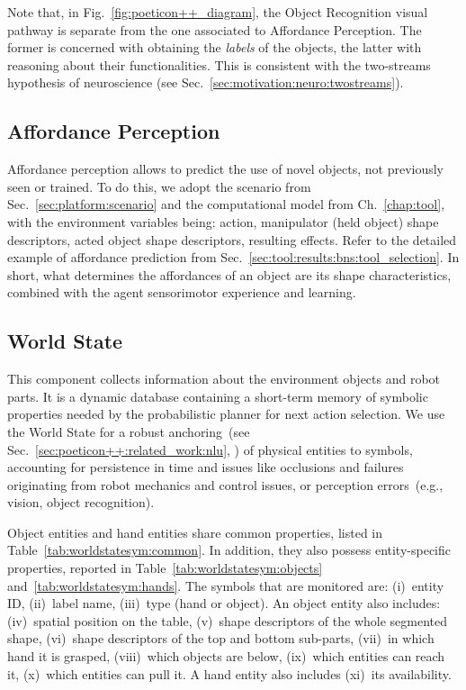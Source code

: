 Note that, in Fig.~\ref{fig:poeticon++_diagram}, the Object Recognition visual pathway is separate from the one associated to Affordance Perception.
The former is concerned with obtaining the \emph{labels} of the objects, the latter with reasoning about their functionalities.
This is consistent with the two-streams hypothesis of neuroscience (see Sec.~\ref{sec:motivation:neuro:twostreams}).

\subsection{Affordance Perception}
\label{sec:poeticon++:proposed_approach:affordances}

Affordance perception allows to predict the use of novel objects, not previously seen or trained.
To do this, we adopt the scenario from Sec.~\ref{sec:platform:scenario} and the computational model from Ch.~\ref{chap:tool}, with the environment variables being: action, manipulator (held object) shape descriptors, acted object shape descriptors, resulting effects.
Refer to the detailed example of affordance prediction from Sec.~\ref{sec:tool:results:bns:tool_selection}.
In short, what determines the affordances of an object are its shape characteristics, combined with the agent sensorimotor experience and learning.

\subsection{World State}
\label{sec:poeticon++:proposed_approach:worldstate}

This component collects information about the environment objects and robot parts.
It is a dynamic database containing a short-term memory of symbolic properties needed by the probabilistic planner for next action selection.
We use the World State for a robust anchoring~(see Sec.~\ref{sec:poeticon++:related_work:nlu}, \cite{coradeschi:2003:ras,lemaignan:2012:ijsr,elfring:2013:ras}) of physical entities to symbols, accounting for persistence in time and issues like occlusions and failures originating from robot mechanics and control issues, or perception errors~(e.g., vision, object recognition).

Object entities and hand entities share common properties, listed in Table~\ref{tab:worldstatesym:common}.
In addition, they also possess entity-specific properties, reported in Table~\ref{tab:worldstatesym:objects} and~\ref{tab:worldstatesym:hands}.
The symbols that are monitored are:
(i)~entity ID,
(ii)~label name,
(iii)~type (hand or object).
An object entity also includes:
(iv)~spatial position on the table,
(v)~shape descriptors of the whole segmented shape,
(vi)~shape descriptors of the top and bottom sub-parts,
(vii)~in which hand it is grasped,
(viii)~which objects are below,
(ix)~which entities can reach it,
(x)~which entities can pull it.
A hand entity also includes
(xi)~its availability.


